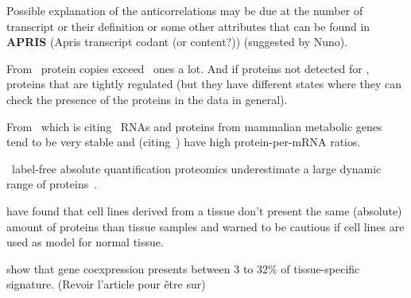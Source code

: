 




Possible explanation of the anticorrelations may be due
at the number of transcript or their definition or some other
attributes that can be found in
\textbf{APRIS} (Apris transcript codant (or content?)) (suggested by Nuno).


From~\citet{Marguerat2012-sn} protein copies exceed \mRNA\ ones a lot.
And if proteins not detected for \mRNAs, proteins that are tightly regulated
(but they have different states where they can check the presence of the proteins
in the data in general).

From~\citet{Vogel2012-sq} which is citing~\citet{schwanhausserglobal:2011}
RNAs and proteins from mammalian metabolic genes tend to be very stable
and (citing~\citet{Vogel2010-ux}) have high protein-per-mRNA ratios.

\ms\ label-free absolute quantification proteomics
underestimate a large dynamic range of proteins~.


\citet{Edfors2016-kv} have found that cell lines derived from a tissue don't present
the same (absolute) amount of proteins than tissue samples and warned to be cautious
if cell lines are used as model for normal tissue.



\citet{Farahbod2019-fq} show that gene coexpression presents
between 3 to 32\% of tissue-specific signature.
(Revoir l'article pour être sur)

